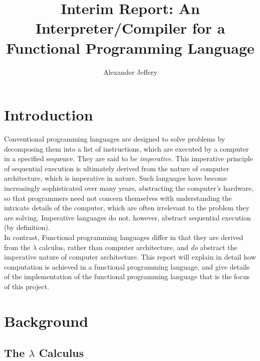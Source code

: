 \documentclass{article}
\title{\textbf{Interim Report}: An Interpreter/Compiler for a Functional Programming Language}
\author{Alexander Jeffery}
\begin{document}
\maketitle

\section{Introduction}

Conventional programming languages are designed to solve problems by decomposing them into a list of instructions, which are executed by a computer in a specified sequence. They are said to be \emph{imperative}. This imperative principle of sequential execution is ultimately derived from the nature of computer architecture, which is imperative in nature. Such languages have become increasingly sophisticated over many years, abstracting the computer's hardware, so that programmers need not concern themselves with understanding the intricate details of the computer, which are often irrelevant to the problem they are solving. Imperative languages do not, however, abstract sequential execution (by definition).
\\
\indent In contrast, Functional programming languages differ in that they are derived from the $\lambda$ calculus, rather than computer architecture, and \emph{do} abstract the imperative nature of computer architecture. This report will explain in detail how computation is achieved in a functional programming language, and give details of the implementation of the functional programming language that is the focus of this project.

\section{Background}
\subsection{The $\lambda$ Calculus}
\end{document}
